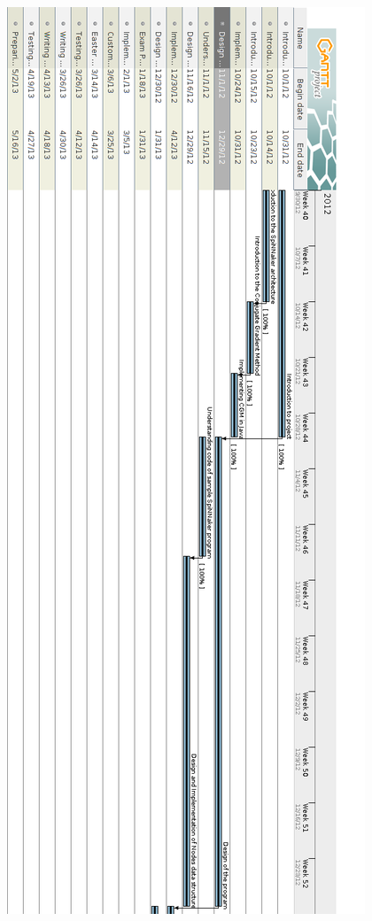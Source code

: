 \documentclass[12pt,a4paper]{article}
\begin{document}
\begin{figure}[h!]
\includegraphics[scale=0.4]{Gantt_Charts/Final_Gantt1.png}
\centering
\end{figure}
\topmargin=0pt
\voffset=0pt
\end{document}
